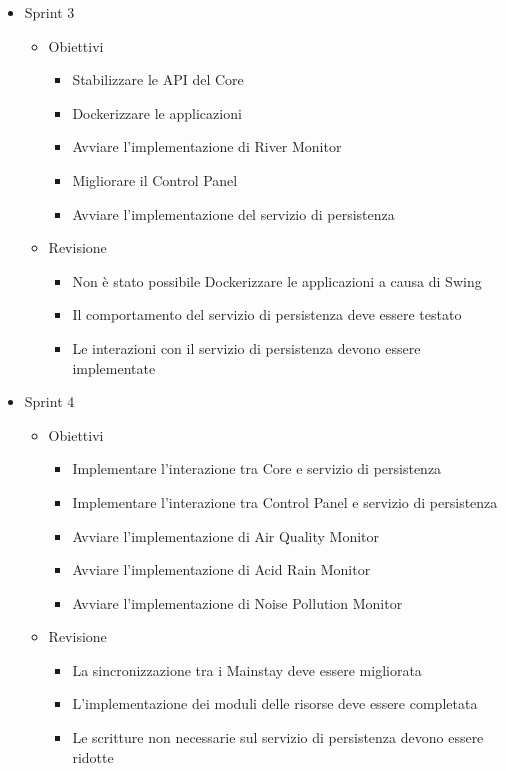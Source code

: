 \documentclass[12pt]{article}
\begin{document}
\begin{itemize}
    \item Sprint 3
    \begin{itemize}
        \item Obiettivi
        \begin{itemize}
            \item Stabilizzare le API del Core
            \item Dockerizzare le applicazioni
            \item Avviare l'implementazione di River Monitor
            \item Migliorare il Control Panel
            \item Avviare l'implementazione del servizio di persistenza
        \end{itemize}
        \item Revisione
        \begin{itemize}
            \item Non è stato possibile Dockerizzare le applicazioni a causa di Swing
            \item Il comportamento del servizio di persistenza deve essere testato
            \item Le interazioni con il servizio di persistenza devono essere implementate
        \end{itemize}
    \end{itemize}
\end{itemize}

\begin{itemize}
    \item Sprint 4
    \begin{itemize}
        \item Obiettivi
        \begin{itemize}
            \item Implementare l'interazione tra Core e servizio di persistenza
            \item Implementare l'interazione tra Control Panel e servizio di persistenza
            \item Avviare l'implementazione di Air Quality Monitor
            \item Avviare l'implementazione di Acid Rain Monitor
            \item Avviare l'implementazione di Noise Pollution Monitor
        \end{itemize}
        \item Revisione
        \begin{itemize}
            \item La sincronizzazione tra i Mainstay deve essere migliorata
            \item L'implementazione dei moduli delle risorse deve essere completata
            \item Le scritture non necessarie sul servizio di persistenza devono essere ridotte
        \end{itemize}
    \end{itemize}
\end{itemize}
\end{document}
